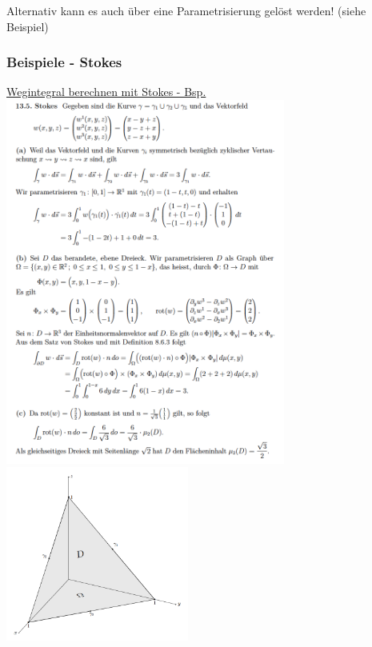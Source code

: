 \documentclass[6pt]{article}
\begin{document}
\begin{multicols*}{3}
		\vspace{5mm}
		
		Alternativ kann es auch {\"u}ber eine Parametrisierung gel{\"o}st werden! (siehe Beispiel)

		\vspace{10mm}
		\quad
		

		\columnbreak
		\subsubsection*{Beispiele - Stokes} 
			\underline{Wegintegral berechnen mit Stokes - Bsp.} \vspace{2mm}\\
			\includegraphics[width=260pt]{images/stokes}
			\includegraphics[width=170pt]{images/stokes2}
	
		
	
	
	


\end{multicols*}
\end{document}

